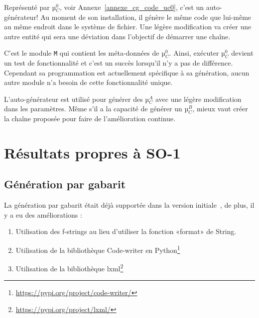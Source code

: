 Représenté par µ$_C^0$, voir Annexe~\ref{annexe_cg_code_uc0}, c’est un auto-générateur! Au moment de son installation, il génère le même code que lui-même au même endroit dans le système de fichier. Une légère modification va créer une autre entité qui sera une déviation dans l’objectif de démarrer une chaîne.

C'est le module \texttt{M} qui contient les méta-données de µ$_C^0$. Ainsi, exécuter µ$_C^0$ devient un test de fonctionnalité et c'est un succès lorsqu'il n'y a pas de différence. Cependant sa programmation est actuellement spécifique à sa génération, aucun autre module n’a besoin de cette fonctionnalité unique.




L'auto-générateur est utilisé pour générer des µ$_C^A$ avec une légère modification dans les paramètres. Même s'il a la capacité de générer un µ$_C^B$, mieux vaut créer la chaîne proposée pour faire de l'amélioration continue.

\section{Résultats propres à SO-1}

\subsection{Génération par gabarit}

La génération par gabarit était déjà supportée dans la version initiale~\cite{bluiksnot_repo}, de plus, il y a eu des améliorations :
\begin{enumerate}
    \item Utilisation des f-strings au lieu d'utiliser la fonction «format» de String.
    \item Utilisation de la bibliothèque Code-writer en Python\footnote{\url{https://pypi.org/project/code-writer/}}
    \item Utilisation de la bibliothèque lxml\footnote{\url{https://pypi.org/project/lxml/}}
\end{enumerate}

